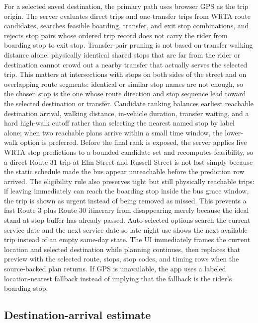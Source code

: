 \documentclass[12pt,letterpaper]{article}
\begin{document}
For a selected saved destination, the primary path uses browser GPS as the trip origin. The server evaluates direct trips and one-transfer trips from WRTA route candidates, searches feasible boarding, transfer, and exit stop combinations, and rejects stop pairs whose ordered trip record does not carry the rider from boarding stop to exit stop. Transfer-pair pruning is not based on transfer walking distance alone: physically identical shared stops that are far from the rider or destination cannot crowd out a nearby transfer that actually serves the selected trip. This matters at intersections with stops on both sides of the street and on overlapping route segments: identical or similar stop names are not enough, so the chosen stop is the one whose route direction and stop sequence lead toward the selected destination or transfer. Candidate ranking balances earliest reachable destination arrival, walking distance, in-vehicle duration, transfer waiting, and a hard high-walk cutoff rather than selecting the nearest named stop by label alone; when two reachable plans arrive within a small time window, the lower-walk option is preferred. Before the final rank is exposed, the server applies live WRTA stop predictions to a bounded candidate set and recomputes feasibility, so a direct Route 31 trip at Elm Street and Russell Street is not lost simply because the static schedule made the bus appear unreachable before the prediction row arrived. The eligibility rule also preserves tight but still physically reachable trips: if leaving immediately can reach the boarding stop inside the bus grace window, the trip is shown as urgent instead of being removed as missed. This prevents a fast Route 3 plus Route 30 itinerary from disappearing merely because the ideal stand-at-stop buffer has already passed. Auto-selected options search the current service date and the next service date so late-night use shows the next available trip instead of an empty same-day state. The UI immediately frames the current location and selected destination while planning continues, then replaces that preview with the selected route, stops, stop codes, and timing rows when the source-backed plan returns. If GPS is unavailable, the app uses a labeled location-nearest fallback instead of implying that the fallback is the rider's boarding stop.

\subsection{Destination-arrival estimate}
\end{document}
